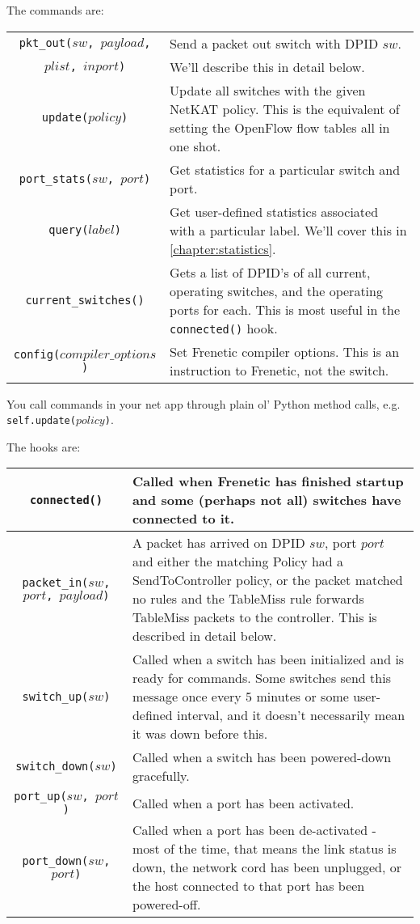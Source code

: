 The commands are:

\bigskip
\begin{tabularx}{6in}{|c|X|}
\hline\hline
\texttt{pkt\_out($sw$, $payload$,} & Send a packet out switch with DPID $sw$.  
\\
\texttt{$plist$, $inport$)} & We'll describe this in detail below.
\\ \hline  
\texttt{update($policy$)} & 
Update all switches with the given NetKAT policy.
This is the equivalent of setting the OpenFlow flow tables all in one shot.  
\\ \hline  
\texttt{port\_stats($sw$, $port$)} & Get statistics for a particular switch and port. 
\\ \hline  
\texttt{query($label$)} & Get user-defined statistics associated with a particular label. 
We'll cover this in \ref{chapter:statistics}.
\\ \hline  
\texttt{current\_switches()} & Gets a list of DPID's of all current, operating switches, and the operating
ports for each.  
This is most useful in the \texttt{connected()} hook.  
\\ \hline  
\texttt{config($compiler\_options$)} & Set Frenetic compiler options.  
This is an instruction to Frenetic, not the switch. 
\\ \hline\hline
\end{tabularx}

\bigskip
You call commands in your net app through plain ol' Python method calls, e.g. \texttt{self.update($policy$)}.  

The hooks are:

\bigskip
\begin{tabularx}{6in}{|c|X|}
\hline\hline
\texttt{connected()} & Called when Frenetic has finished startup and some (perhaps not all) 
switches have connected to it. 
\\ \hline
\texttt{packet\_in($sw$, $port$, $payload$)} & 
 A packet has arrived on DPID $sw$, port $port$ and either the matching Policy had a SendToController policy, or
 the packet matched no rules and the TableMiss rule forwards TableMiss packets to the controller.
 This is described in detail below.
\\ \hline  
\texttt{switch\_up($sw$)} & Called when a switch has been initialized and is ready for commands.  
Some switches send this message once every 5 minutes or some user-defined interval, and it doesn't necessarily
mean it was down before this.
\\ \hline  
\texttt{switch\_down($sw$)} & Called when a switch has been powered-down gracefully.
\\ \hline  
\texttt{port\_up($sw$, $port$)} & Called when a port has been activated.
\\ \hline  
\texttt{port\_down($sw$, $port$)} & Called when a port has been de-activated - most of the time, that means the link
status is down, the network cord has been unplugged, or the host connected to that port has been powered-off.
\\ \hline\hline
\end{tabularx}

